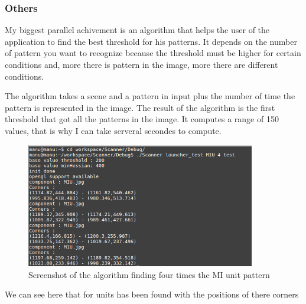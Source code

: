 	\subsubsection{Others}
	
	\par My biggest parallel achivement is an algorithm that helps the user of the application to find the best threshold for his patterns. It depends on the number of pattern you want to recognize because the threshold must be higher for certain conditions and, more there is pattern in the image, more there are different conditions. 
	\par The algorithm takes a scene and a pattern in input plus the number of time the pattern is represented in the image. The result of the algorithm is the first threshold that got all the patterns in the image. It computes a range of 150 values, that is why I can take serveral secondes to compute.
	
	\begin{figure}[h]
		\begin{center}
			\includegraphics[width=10cm]{images_not_compressed/tester.png}
			\caption{Screenshot of the algorithm finding four times the MI unit pattern}
		\end{center}
	\end{figure}	
	
	\par We can see here that for units has been found with the positions of there corners
	
